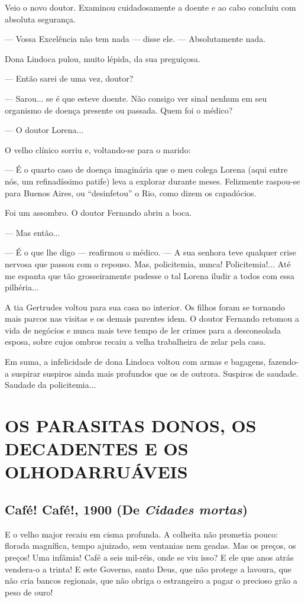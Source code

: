 Veio o novo doutor. Examinou cuidadosamente a doente e ao cabo concluiu
com absoluta segurança.

--- Vossa Excelência não tem nada --- disse ele. --- Absolutamente nada.

Dona Lindoca pulou, muito lépida, da sua preguiçosa.

--- Então sarei de uma vez, doutor?

--- Sarou... se é que esteve doente. Não consigo ver sinal nenhum em seu
organismo de doença presente ou passada. Quem foi o médico?

--- O doutor Lorena...

O velho clínico sorriu e, voltando-se para o marido:

--- É o quarto caso de doença imaginária que o meu colega Lorena (aqui
entre nós, um refinadíssimo patife) leva a explorar durante meses.
Felizmente raspou-se para Buenos Aires, ou ``desinfetou'' o Rio, como
dizem os capadócios.

Foi um assombro. O doutor Fernando abriu a boca.

--- Mas então...

--- É o que lhe digo --- reafirmou o médico. --- A sua senhora teve
qualquer crise nervosa que passou com o repouso. Mas, policitemia,
nunca! Policitemia!... Até me espanta que tão grosseiramente pudesse o
tal Lorena iludir a todos com essa pilhéria...

A tia Gertrudes voltou para sua casa no interior. Os filhos foram se
tornando mais parcos nas visitas e os demais parentes idem. O doutor
Fernando retomou a vida de negócios e nunca mais teve tempo de ler
crimes para a desconsolada esposa, sobre cujos ombros recaiu a velha
trabalheira de zelar pela casa.

Em suma, a infelicidade de dona Lindoca voltou com armas e bagagens,
fazendo-a suspirar suspiros ainda mais profundos que os de outrora.
Suspiros de saudade. Saudade da policitemia...

\part{OS PARASITAS DONOS, OS DECADENTES E OS OLHODARRUÁVEIS}

\chapter{Café! Café!, 1900 (De \emph{Cidades mortas})}

E o velho major recaiu em cisma profunda. A colheita não prometia pouco:
florada magnífica, tempo ajuizado, sem ventanias nem geadas. Mas os
preços, os preços! Uma infâmia! Café a seis mil-réis, onde se viu isso?
E ele que anos atrás vendera-o a trinta! E este Governo, santo Deus, que
não protege a lavoura, que não cria bancos regionais, que não obriga o
estrangeiro a pagar o precioso grão a peso de ouro!

